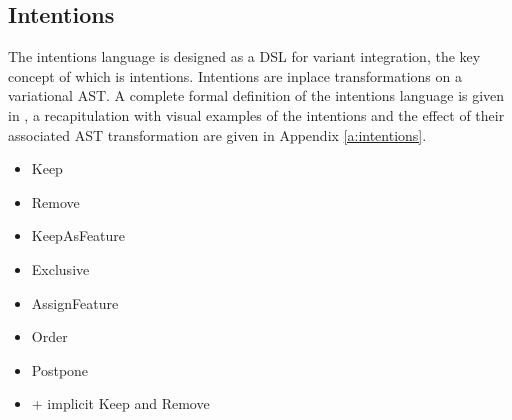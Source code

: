 \subsection{Intentions}
The intentions language is designed as a DSL for variant integration, the key concept of which is intentions. Intentions are inplace transformations on a variational AST. A complete formal definition of the intentions language is given in \cite{lillack2017intentions}, a recapitulation with visual examples of the intentions and the effect of their associated AST transformation are given in Appendix \ref{a:intentions}.
\begin{itemize}
    \item{Keep}
    \item{Remove}
    \item{KeepAsFeature}
    \item{Exclusive}
    \item{AssignFeature}
    \item{Order}
    \item{Postpone}
    \item{+ implicit Keep and Remove}
\end{itemize}


